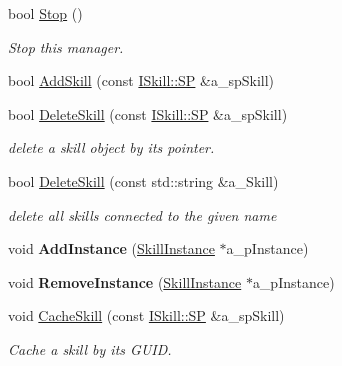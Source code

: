 \begin{DoxyCompactItemize}
bool \hyperlink{class_skill_manager_a4a6e700c9c6cca9f07f65d16342a5907}{Stop} ()
\begin{DoxyCompactList}\small\item\em Stop this manager. \end{DoxyCompactList}\item 
bool \hyperlink{class_skill_manager_a27b25eebb68ae5679073b4c3bf472857}{Add\+Skill} (const \hyperlink{class_i_skill_a68bcce999ab0444eebaca3fb8ddb8a31}{I\+Skill\+::\+SP} \&a\+\_\+sp\+Skill)
\item 
\mbox{\label{class_skill_manager_a4919941d2c625b23c77a728c97e04575}} 
bool \hyperlink{class_skill_manager_a4919941d2c625b23c77a728c97e04575}{Delete\+Skill} (const \hyperlink{class_i_skill_a68bcce999ab0444eebaca3fb8ddb8a31}{I\+Skill\+::\+SP} \&a\+\_\+sp\+Skill)
\begin{DoxyCompactList}\small\item\em delete a skill object by it\textquotesingle{}s pointer. \end{DoxyCompactList}\item 
\mbox{\label{class_skill_manager_a7e637625aef16e5618f4db5dd9d677ba}} 
bool \hyperlink{class_skill_manager_a7e637625aef16e5618f4db5dd9d677ba}{Delete\+Skill} (const std\+::string \&a\+\_\+\+Skill)
\begin{DoxyCompactList}\small\item\em delete all skills connected to the given name \end{DoxyCompactList}\item 
\mbox{\label{class_skill_manager_a805a83759fe64ab0bdfdb342b21b5a7a}} 
void {\bfseries Add\+Instance} (\hyperlink{class_skill_instance}{Skill\+Instance} $\ast$a\+\_\+p\+Instance)
\item 
\mbox{\label{class_skill_manager_ab62d9744b0d8f9822b5f566105ae528a}} 
void {\bfseries Remove\+Instance} (\hyperlink{class_skill_instance}{Skill\+Instance} $\ast$a\+\_\+p\+Instance)
\item 
\mbox{\label{class_skill_manager_ad5c31869afc31cfba3efc73903aaa407}} 
void \hyperlink{class_skill_manager_ad5c31869afc31cfba3efc73903aaa407}{Cache\+Skill} (const \hyperlink{class_i_skill_a68bcce999ab0444eebaca3fb8ddb8a31}{I\+Skill\+::\+SP} \&a\+\_\+sp\+Skill)
\begin{DoxyCompactList}\small\item\em Cache a skill by it\textquotesingle{}s G\+U\+ID. \end{DoxyCompactList}\end{DoxyCompactItemize}
